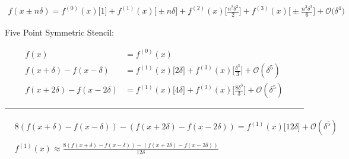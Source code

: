 \documentclass{article}
\begin{document}
\begin{align*}
f(x \pm n \delta) = f^{(0)}(x) \Big[ 1 \Big] + f^{(1)}(x) \Big[ \pm n \delta \Big] + f^{(2)}(x) \Big[ \frac{n^2 \delta^2}{2} \Big] + f^{(3)}(x) \Big[ \pm \frac{n^3 \delta^3}{6} \Big] + \mathcal{O} \big(\delta^4 \big)
\end{align*}


\vspace{2cm}
Five Point Symmetric Stencil:

\begin{align*}
f(x) &= f^{(0)}(x) \\
f(x+\delta) - f(x-\delta) &= f^{(1)}(x) \Big[ 2 \delta \Big] + f^{(3)}(x) \Big[ \frac{\delta^3}{3} \Big] + \mathcal{O}(\delta^5)\\
f(x+2\delta) - f(x - 2 \delta) &= f^{(1)}(x) \Big[4 \delta \Big] + f^{(3)}(x) \Big[ \frac{8 \delta^3}{3}\Big] + \mathcal{O}(\delta^5)
\end{align*}

\hrule
\begin{align}
&8 \left( f(x+\delta) - f(x-\delta) \right) - \left( f(x+2\delta) - f(x-2\delta) \right) = f^{(1)}(x) \Big[12 \delta \Big] + \mathcal{O}(\delta^5) \\
&\nonumber \\
&f^{(1)}(x) \approx \frac{8 \left( f(x+\delta) - f(x-\delta) \right) - \left( f(x+2\delta) - f(x-2\delta) \right)}{12 \delta}
\end{align}
\end{document}
